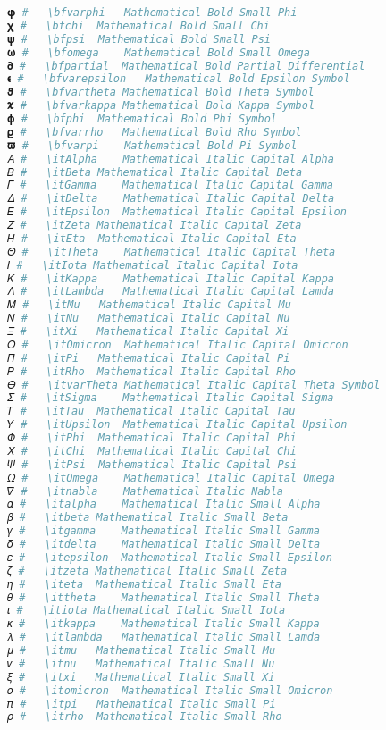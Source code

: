 \begin{lstlisting}[language=Julia]
𝛗 #   \bfvarphi   Mathematical Bold Small Phi
𝛘 #   \bfchi  Mathematical Bold Small Chi
𝛙 #   \bfpsi  Mathematical Bold Small Psi
𝛚 #   \bfomega    Mathematical Bold Small Omega
𝛛 #   \bfpartial  Mathematical Bold Partial Differential
𝛜 #   \bfvarepsilon   Mathematical Bold Epsilon Symbol
𝛝 #   \bfvartheta Mathematical Bold Theta Symbol
𝛞 #   \bfvarkappa Mathematical Bold Kappa Symbol
𝛟 #   \bfphi  Mathematical Bold Phi Symbol
𝛠 #   \bfvarrho   Mathematical Bold Rho Symbol
𝛡 #   \bfvarpi    Mathematical Bold Pi Symbol
𝛢 #   \itAlpha    Mathematical Italic Capital Alpha
𝛣 #   \itBeta Mathematical Italic Capital Beta
𝛤 #   \itGamma    Mathematical Italic Capital Gamma
𝛥 #   \itDelta    Mathematical Italic Capital Delta
𝛦 #   \itEpsilon  Mathematical Italic Capital Epsilon
𝛧 #   \itZeta Mathematical Italic Capital Zeta
𝛨 #   \itEta  Mathematical Italic Capital Eta
𝛩 #   \itTheta    Mathematical Italic Capital Theta
𝛪 #   \itIota Mathematical Italic Capital Iota
𝛫 #   \itKappa    Mathematical Italic Capital Kappa
𝛬 #   \itLambda   Mathematical Italic Capital Lamda
𝛭 #   \itMu   Mathematical Italic Capital Mu
𝛮 #   \itNu   Mathematical Italic Capital Nu
𝛯 #   \itXi   Mathematical Italic Capital Xi
𝛰 #   \itOmicron  Mathematical Italic Capital Omicron
𝛱 #   \itPi   Mathematical Italic Capital Pi
𝛲 #   \itRho  Mathematical Italic Capital Rho
𝛳 #   \itvarTheta Mathematical Italic Capital Theta Symbol
𝛴 #   \itSigma    Mathematical Italic Capital Sigma
𝛵 #   \itTau  Mathematical Italic Capital Tau
𝛶 #   \itUpsilon  Mathematical Italic Capital Upsilon
𝛷 #   \itPhi  Mathematical Italic Capital Phi
𝛸 #   \itChi  Mathematical Italic Capital Chi
𝛹 #   \itPsi  Mathematical Italic Capital Psi
𝛺 #   \itOmega    Mathematical Italic Capital Omega
𝛻 #   \itnabla    Mathematical Italic Nabla
𝛼 #   \italpha    Mathematical Italic Small Alpha
𝛽 #   \itbeta Mathematical Italic Small Beta
𝛾 #   \itgamma    Mathematical Italic Small Gamma
𝛿 #   \itdelta    Mathematical Italic Small Delta
𝜀 #   \itepsilon  Mathematical Italic Small Epsilon
𝜁 #   \itzeta Mathematical Italic Small Zeta
𝜂 #   \iteta  Mathematical Italic Small Eta
𝜃 #   \ittheta    Mathematical Italic Small Theta
𝜄 #   \itiota Mathematical Italic Small Iota
𝜅 #   \itkappa    Mathematical Italic Small Kappa
𝜆 #   \itlambda   Mathematical Italic Small Lamda
𝜇 #   \itmu   Mathematical Italic Small Mu
𝜈 #   \itnu   Mathematical Italic Small Nu
𝜉 #   \itxi   Mathematical Italic Small Xi
𝜊 #   \itomicron  Mathematical Italic Small Omicron
𝜋 #   \itpi   Mathematical Italic Small Pi
𝜌 #   \itrho  Mathematical Italic Small Rho

\end{lstlisting}
